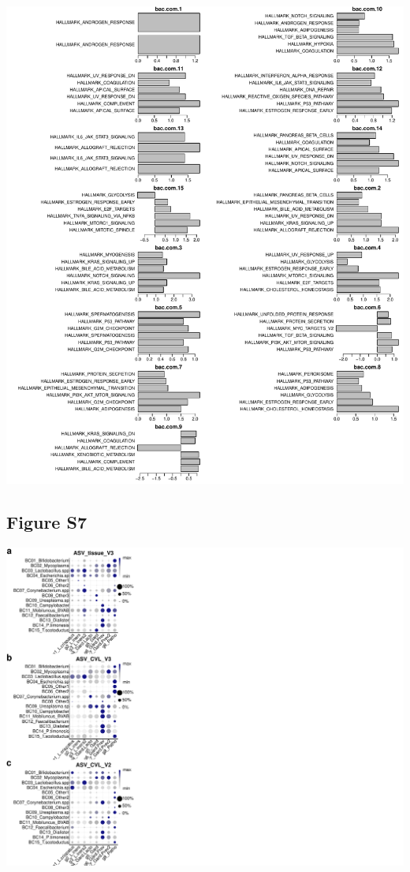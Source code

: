 \documentclass[
]{article}
\begin{document}
\includegraphics[width=1\linewidth]{manuscript_template_files/figure-latex/unnamed-chunk-16-1}

\clearpage

\hypertarget{figure-s7}{%
\subsection{Figure S7}\label{figure-s7}}

\includegraphics[width=1\linewidth]{manuscript_template_files/figure-latex/unnamed-chunk-17-1}
\end{document}
